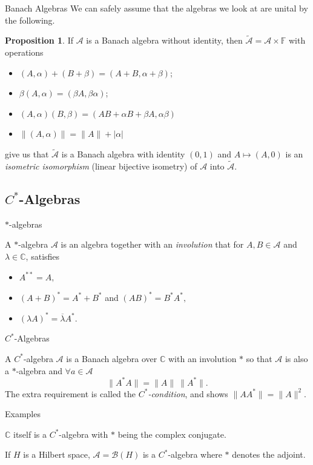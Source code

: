 \documentclass[pdf]{beamer}
\theoremstyle{definition}
\theoremstyle{theorem}
\newtheorem*{proposition}{Proposition}
\newcommand{\F}{\mathbb{F}}
\newcommand{\A}{\mathcal{A}}
\newcommand{\C}{\mathbb{C}}
\begin{document}
\begin{frame}{Banach Algebras}
We can safely assume that the algebras we look at are unital by the following.
	\begin{proposition}
		If $\A$ is a Banach algebra without identity, then $\tilde{\A} = \A\times \F$ with operations
		\begin{itemize}
		\item $(A,\alpha)+(B+\beta)=(A+B,\alpha+\beta)$;
		\item $\beta(A,\alpha)=(\beta A,\beta \alpha)$;
		\item $(A,\alpha)(B,\beta)=(AB+\alpha B+\beta A,\alpha \beta)$
		\item $\|(A,\alpha)\|=\|A\|+|\alpha|$
		\end{itemize}
	give us that $\tilde{\A}$ is a Banach algebra with identity $(0,1)$ and $A\mapsto 		(A,0)$ is an \emph{isometric isomorphism} (linear bijective isometry) of $\A$ into $\tilde{\A}$.
	\end{proposition}
\end{frame}

\subsection{$C^*$-Algebras}
\begin{frame}{$*$-algebras}
	\begin{definition}
	A $*$-algebra $\A$ is an algebra together with an \emph{involution} that for $A,B\in \A$ and $\lambda \in \C$, satisfies
	\begin{itemize}
	\item $A^{**}=A,$
	\item $(A+B)^*=A^*+B^*$ and $(AB)^*=B^*A^*,$
	\item $(\lambda A)^*=\overline{\lambda}A^*.$
	\end{itemize}
	\end{definition}
\end{frame}

\begin{frame}{$C^*$-Algebras}
	\begin{definition}
A $C^*$-algebra $\A$ is a Banach algebra over $\C$ with an involution $*$ so that $\A$ is also a $*$-algebra and $\forall a \in \A$
\[
\|A^* A\|=\|A\|~\|A^*\|.
\]
The extra requirement is called the \emph{$C^*$-condition}, and shows $\|A A^*\|=\|A\|^2.$
	\end{definition}
\end{frame}

\begin{frame}{Examples}
	\begin{example}
	$\C$ itself is a $C^*$-algebra with $*$ being the complex conjugate.
	\end{example}
	\begin{example}
	If $H$ is a Hilbert space, $\A=\mathscr{B}(H)$ is a $C^*$-algebra where $*$ denotes the adjoint.
	\end{example}
\end{frame}
\end{document}
